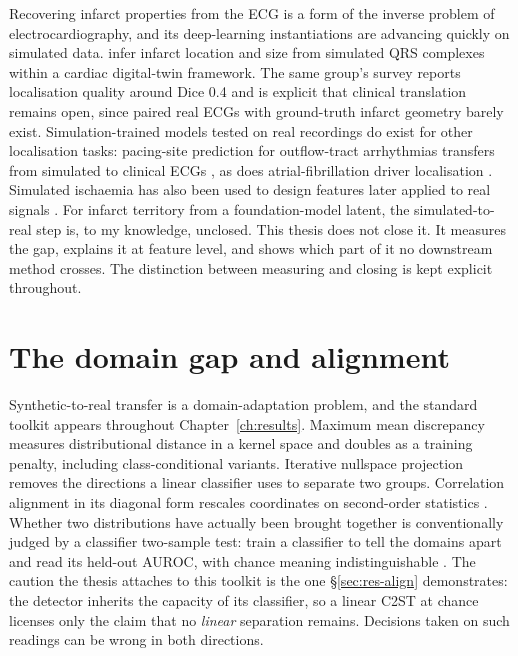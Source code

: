 Recovering infarct properties from the ECG is a form of the inverse problem of electrocardiography, and its deep-learning instantiations are advancing quickly on simulated data. \citet{li2024tmi} infer infarct location and size from simulated QRS complexes within a cardiac digital-twin framework. The same group's survey \citep{li2025survey} reports localisation quality around Dice 0.4 and is explicit that clinical translation remains open, since paired real ECGs with ground-truth infarct geometry barely exist. Simulation-trained models tested on real recordings do exist for other localisation tasks: pacing-site prediction for outflow-tract arrhythmias transfers from simulated to clinical ECGs \citep{doste2022training}, as does atrial-fibrillation driver localisation \citep{luongo2021machine}. Simulated ischaemia has also been used to design features later applied to real signals \citep{ledezma2019modeling}. For infarct territory from a foundation-model latent, the simulated-to-real step is, to my knowledge, unclosed. This thesis does not close it. It measures the gap, explains it at feature level, and shows which part of it no downstream method crosses. The distinction between measuring and closing is kept explicit throughout. 

\section{The domain gap and alignment}
\label{sec:bg-align}

Synthetic-to-real transfer is a domain-adaptation problem, and the standard toolkit appears throughout Chapter~\ref{ch:results}. Maximum mean discrepancy \citep{gretton2012kernel} measures distributional distance in a kernel space and doubles as a training penalty, including class-conditional variants. Iterative nullspace projection \citep{ravfogel2020null} removes the directions a linear classifier uses to separate two groups. Correlation alignment in its diagonal form rescales coordinates on second-order statistics \citep{sun2016coral}. Whether two distributions have actually been brought together is conventionally judged by a classifier two-sample test: train a classifier to tell the domains apart and read its held-out AUROC, with chance meaning indistinguishable \citep{lopezpaz2017c2st}. The caution the thesis attaches to this toolkit is the one \S\ref{sec:res-align} demonstrates: the detector inherits the capacity of its classifier, so a linear C2ST at chance licenses only the claim that no \emph{linear} separation remains. Decisions taken on such readings can be wrong in both directions. 

